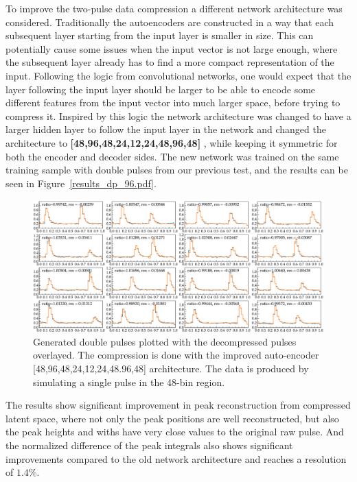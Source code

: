 To improve the two-pulse data compression a different network architecture was considered. Traditionally the autoencoders are constructed in a way that each subsequent layer starting from the input layer is smaller in size. This can potentially cause some issues when the input vector is not large enough, where the subsequent layer already has to find a more compact representation of the input. 
Following the logic from convolutional networks, one would expect that the layer following the input layer should be larger to be able to encode some different features from the input vector into much larger space, before trying to compress it. Inspired by this logic the network architecture was changed to have a larger hidden layer to follow the input layer in the network and changed the architecture to 
{\bf [48,96,48,24,12,24,48,96,48] }, while keeping it symmetric for both the encoder and decoder sides. The new network was trained on the same training sample with double pulses from our previous test, and the results can be seen in Figure~\ref{results_dp_96.pdf}. 

\begin{figure}[h!]
\centering
\includegraphics[width=0.9\columnwidth]{results_dp_96.pdf}
\caption{Generated double pulses plotted with the decompressed pulses overlayed. The compression is done with the improved auto-encoder [48,96,48,24,12,24,48.96,48] architecture. The data is produced by simulating a single pulse in the 48-bin region.} 
\label{fig:results_dp_96}
\end{figure}

The results show significant improvement in peak reconstruction from compressed latent space, where not only the peak positions are well reconstructed, but also the peak heights and withs have very close values to the original raw pulse. And the normalized difference of the peak integrals also shows significant improvements compared to the old network architecture and reaches a resolution of $1.4\%$.

